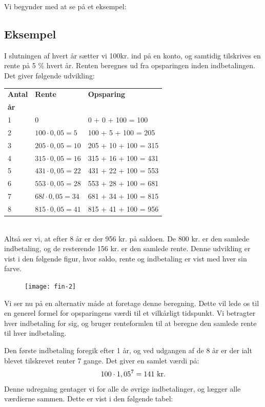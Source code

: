 \documentclass[12pt,oneside,a4paper]{article}
\begin{document}
Vi begynder med at se på et eksempel:
\begin{tcolorbox}
\subsection*{Eksempel}
I slutningen af hvert år sætter vi 100kr. ind på en konto, og samtidig
tilskrives en rente på 5 $\%$ hvert år. Renten beregnes ud fra
opsparingen inden indbetalingen.  Det giver følgende udvikling:
\\

\begin{tabular}{|l|l|l|}
    \hline
    \textbf{Antal} & \textbf{Rente} & \textbf{Opsparing} \\
    \textbf{år} &  & \\
    \hline
    1 & 0 & 0 + 0 + 100 = 100 \\
    \hline
    2 & $100\cdot 0,05 = 5$ & 100 + 5 + 100 = 205 \\
    \hline
    3 & $205\cdot 0,05 = 10$ & 205 + 10 + 100 = 315 \\
    \hline
    4 & $315\cdot 0,05 = 16$ & 315 + 16 + 100 = 431 \\
    \hline
    5 & $431\cdot 0,05 = 22$ & 431 + 22 + 100 = 553 \\
    \hline
    6 & $553\cdot 0,05 = 28$ & 553 + 28 + 100 = 681 \\
    \hline
    7 & $68l\cdot 0,05 = 34$ & 681 + 34 + 100 = 815 \\
    \hline
    8 & $815\cdot 0,05 = 41$ & 815 + 41 + 100 = 956 \\
    \hline
\end{tabular}
\\

Altså ser vi, at efter 8 år er der 956 kr. på saldoen. De 800 kr. er den
samlede indbetaling, og de resterende 156 kr. er den samlede rente.
Denne udvikling er vist i den følgende figur, hvor saldo, rente og indbetaling er vist med hver sin farve.
\begin{figure}[H]
    \centering
    \texttt{[image: fin-2]}
\end{figure}
\end{tcolorbox}

Vi ser nu på en alternativ måde at foretage denne beregning. Dette vil lede os
til en generel formel for opsparingens værdi til et vilkårligt tidspunkt. Vi
betragter hver indbetaling for sig, og bruger renteformlen til at beregne den
samlede rente til hver indbetaling.

Den første indbetaling foregik efter 1 år, og ved udgangen af de 8 år
er der ialt blevet tilskrevet renter 7 gange.  Det giver en samlet værdi på:
\[
    100\cdot 1,05^7 = 141 {\,\,\rm kr.}
\]
Denne udregning gentager vi for alle de øvrige indbetalinger, og lægger alle
værdierne sammen.  Dette er vist i den følgende tabel:
\\
\end{document}
